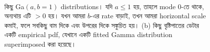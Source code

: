 \documentclass[graybox, envcountchap, twocolumn]{styles/svmult}
\begin{document}
\begin{figure}[hbtp]
\centering
{} \\
\caption{{\bengalifont কিছু Ga$(a, b=1)$ distributions। যদি $a \leq 1$ হয়, তাহলে mode 0-তে থাকে, অন্যথায় এটি $>0$ হয়। যখন আমরা $b$-এর rate বাড়াই, তখন আমরা horizontal scale কমাই, ফলে সবকিছু বাম দিকে এবং উপরের দিকে সঙ্কুচিত হয়। (b) কিছু বৃষ্টিপাতের ডেটার একটি empirical pdf, যেখানে একটি fitted Gamma distribution superimposed করা হয়েছে।}}

\label{fig:gamma-distribution} 
\end{figure}
\end{document}
